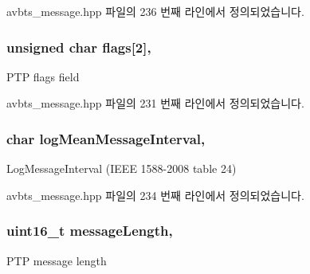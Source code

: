 avbts\+\_\+message.\+hpp 파일의 236 번째 라인에서 정의되었습니다.

\subsubsection[{\texorpdfstring{flags}{flags}}]{\setlength{\rightskip}{0pt plus 5cm}unsigned char flags\mbox{[}2\mbox{]}\hspace{0.3cm}{\ttfamily [protected]}, {\ttfamily [inherited]}}\hypertarget{class_p_t_p_message_common_a8c2f6104634deb80d932fa0cd9166fba}{}\label{class_p_t_p_message_common_a8c2f6104634deb80d932fa0cd9166fba}
P\+TP flags field 

avbts\+\_\+message.\+hpp 파일의 231 번째 라인에서 정의되었습니다.

\subsubsection[{\texorpdfstring{log\+Mean\+Message\+Interval}{logMeanMessageInterval}}]{\setlength{\rightskip}{0pt plus 5cm}char log\+Mean\+Message\+Interval\hspace{0.3cm}{\ttfamily [protected]}, {\ttfamily [inherited]}}\hypertarget{class_p_t_p_message_common_a2f897c329a52f79528d1b1248254dd1b}{}\label{class_p_t_p_message_common_a2f897c329a52f79528d1b1248254dd1b}
Log\+Message\+Interval (I\+E\+EE 1588-\/2008 table 24) 

avbts\+\_\+message.\+hpp 파일의 234 번째 라인에서 정의되었습니다.

\subsubsection[{\texorpdfstring{message\+Length}{messageLength}}]{\setlength{\rightskip}{0pt plus 5cm}uint16\+\_\+t message\+Length\hspace{0.3cm}{\ttfamily [protected]}, {\ttfamily [inherited]}}\hypertarget{class_p_t_p_message_common_a6c490faee54bca860c4d897aae50990f}{}\label{class_p_t_p_message_common_a6c490faee54bca860c4d897aae50990f}
P\+TP message length 

